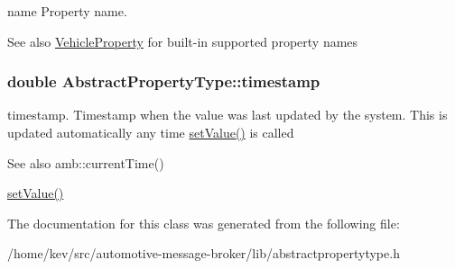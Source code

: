 name Property name. 

\begin{DoxySeeAlso}{See also}
\hyperlink{classVehicleProperty}{Vehicle\+Property} for built-\/in supported property names 
\end{DoxySeeAlso}
\hypertarget{classAbstractPropertyType_a6a391546600fde38a351d3d236be8a9b}{
\subsubsection[{timestamp}]{\setlength{\rightskip}{0pt plus 5cm}double Abstract\+Property\+Type\+::timestamp}}\label{classAbstractPropertyType_a6a391546600fde38a351d3d236be8a9b}


timestamp. Timestamp when the value was last updated by the system. This is updated automatically any time \hyperlink{classAbstractPropertyType_a1b2598b86718911533587a5bd41bfb9c}{set\+Value()} is called 

\begin{DoxySeeAlso}{See also}
amb\+::current\+Time() 

\hyperlink{classAbstractPropertyType_a1b2598b86718911533587a5bd41bfb9c}{set\+Value()} 
\end{DoxySeeAlso}


The documentation for this class was generated from the following file\+:\begin{DoxyCompactItemize}
\item 
/home/kev/src/automotive-\/message-\/broker/lib/abstractpropertytype.\+h\end{DoxyCompactItemize}
